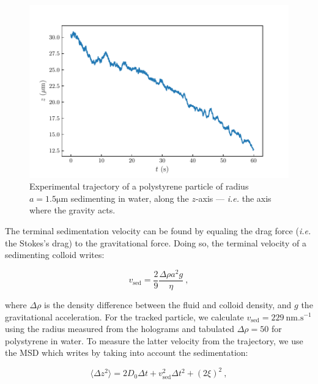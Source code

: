 \begin{figure}[H]
	\centering
	\includegraphics{02_body/chapter2/images/sedimenting/traj_sedimenting.pdf}
	\caption{Experimental trajectory of a polystyrene particle of radius $a = 1.5 \mathrm{\mu m}$ sedimenting in water, along the $z$-axis --- \textit{i.e.} the axis where the gravity acts.}
	\label{fig:trajsed}
\end{figure}

The terminal sedimentation velocity can be found by equaling the drag force (\textit{i.e.} the Stokes's drag) to the gravitational force. Doing so, the terminal velocity of a sedimenting colloid writes:

\begin{equation}
	v_\mathrm{sed} = \frac{2}{9} \frac{\Delta \rho a^2 g}{\eta} ~,
	\label{vsed}
\end{equation}

where $\Delta \rho$ is the density difference between the fluid and colloid density, and $g$ the gravitational acceleration. For the tracked particle, we calculate $v_\mathrm{sed} = 229 ~\mathrm{nm.s^{-1}}$ using the radius measured from the holograms and tabulated $\Delta \rho = 50$ for polystyrene in water. To measure the latter velocity from the trajectory, we use the \gls{MSD} which writes by taking into account the sedimentation:

\begin{equation}
	\langle \Delta z ^2 \rangle = 2D_0 \Delta t + v_\mathrm{sed}^2 \Delta t^2 + (2\xi)^2 ~,
	\label{Eq.sedmsd}
\end{equation}

